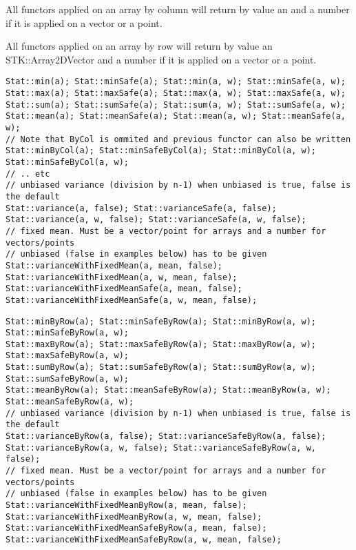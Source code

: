 \documentclass[a4paper,10pt]{article}
\begin{document}
All functors applied on an array by column will return by value an
 and a number if it is applied on a vector or a point.

All functors applied on an array by row will return by value an STK::Array2DVector
and a number if it is applied on a vector or a point.

\begin{lstlisting}[style=customcpp,caption=Functors by column]
Stat::min(a); Stat::minSafe(a); Stat::min(a, w); Stat::minSafe(a, w);
Stat::max(a); Stat::maxSafe(a); Stat::max(a, w); Stat::maxSafe(a, w);
Stat::sum(a); Stat::sumSafe(a); Stat::sum(a, w); Stat::sumSafe(a, w);
Stat::mean(a); Stat::meanSafe(a); Stat::mean(a, w); Stat::meanSafe(a, w);
// Note that ByCol is ommited and previous functor can also be written
Stat::minByCol(a); Stat::minSafeByCol(a); Stat::minByCol(a, w); Stat::minSafeByCol(a, w);
// .. etc
// unbiased variance (division by n-1) when unbiased is true, false is the default
Stat::variance(a, false); Stat::varianceSafe(a, false);
Stat::variance(a, w, false); Stat::varianceSafe(a, w, false);
// fixed mean. Must be a vector/point for arrays and a number for vectors/points
// unbiased (false in examples below) has to be given
Stat::varianceWithFixedMean(a, mean, false);
Stat::varianceWithFixedMean(a, w, mean, false);
Stat::varianceWithFixedMeanSafe(a, mean, false);
Stat::varianceWithFixedMeanSafe(a, w, mean, false);
\end{lstlisting}


\begin{lstlisting}[style=customcpp,caption=Functors by row]
Stat::minByRow(a); Stat::minSafeByRow(a); Stat::minByRow(a, w); Stat::minSafeByRow(a, w);
Stat::maxByRow(a); Stat::maxSafeByRow(a); Stat::maxByRow(a, w); Stat::maxSafeByRow(a, w);
Stat::sumByRow(a); Stat::sumSafeByRow(a); Stat::sumByRow(a, w); Stat::sumSafeByRow(a, w);
Stat::meanByRow(a); Stat::meanSafeByRow(a); Stat::meanByRow(a, w); Stat::meanSafeByRow(a, w);
// unbiased variance (division by n-1) when unbiased is true, false is the default
Stat::varianceByRow(a, false); Stat::varianceSafeByRow(a, false);
Stat::varianceByRow(a, w, false); Stat::varianceSafeByRow(a, w, false);
// fixed mean. Must be a vector/point for arrays and a number for vectors/points
// unbiased (false in examples below) has to be given
Stat::varianceWithFixedMeanByRow(a, mean, false);
Stat::varianceWithFixedMeanByRow(a, w, mean, false);
Stat::varianceWithFixedMeanSafeByRow(a, mean, false);
Stat::varianceWithFixedMeanSafeByRow(a, w, mean, false);
\end{lstlisting}
\end{document}
